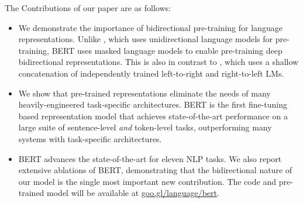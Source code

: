 The Contributions of our paper are as follows:
\begin{itemize}
	\item We demonstrate the importance of bidirectional pre-training for language representations. Unlike \citet{Alec2018}, which uses unidirectional language models for pre-training, BERT uses masked language models to enable pre-training deep bidirectional representations. This is also in contrast to \citet{Matthew2018}, which uses a shallow concatenation of independently trained left-to-right and right-to-left LMs.
	\item We show that pre-trained representations eliminate the needs of many heavily-engineered task-specific architectures. BERT is the first fine-tuning based representation model that achieves state-of-the-art performance on a large suite of sentence-level \emph{and} token-level tasks, outperforming many systems with task-specific architectures.
	\item BERT advances the state-of-the-art for eleven NLP tasks. We also report extensive ablations of BERT, demonstrating that the bidirectional nature of our model is the single most important new contribution. The code and pre-trained model will be available at \url{goo.gl/language/bert}.
\end{itemize}














